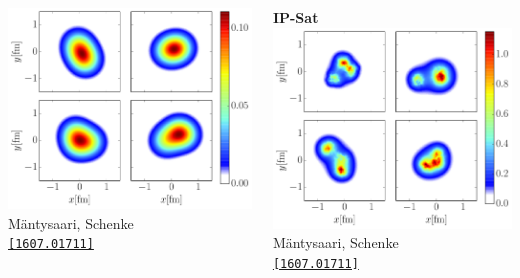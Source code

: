 \documentclass[aspectratio=169,11pt,usenames,dvipsnames]{beamer}
\begin{document}
\begin{frame}
\begin{columns}[onlytextwidth,c]
\begin{center}
                    \includegraphics[width=0.7\columnwidth]{images/density_smooth.pdf}
                    \\[-6pt]
                    {\tiny Mäntysaari, Schenke} \\ \tiny \href{https://arxiv.org/abs/1607.01711}{\color{blue}\texttt{[1607.01711]}\scalebox{.6}{$^\text{\tiny\faExternalLink}$}}
                \end{center}
                \begin{center}
                    {\scriptsize\bfseries IP-Sat}
                    \\[1pt]
                    \includegraphics[width=0.7\columnwidth]{images/density_ipglasma.pdf}
                    \\[-6pt]
                    {\tiny Mäntysaari, Schenke} \\ \tiny \href{https://arxiv.org/abs/1607.01711}{\color{blue}\texttt{[1607.01711]}\scalebox{.6}{$^\text{\tiny\faExternalLink}$}}
                \end{center}

\end{columns}
\end{frame}
\end{document}
